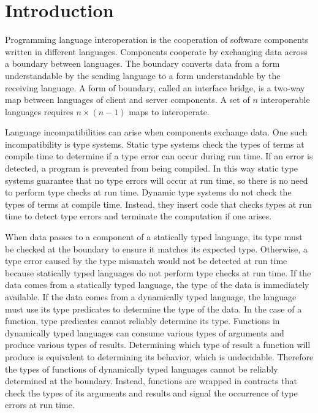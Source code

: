 \chapter{Introduction}

Programming language interoperation is the cooperation of software components written in different languages.  Components cooperate by exchanging data across a boundary between languages.  The boundary converts data from a form understandable by the sending language to a form understandable by the receiving language.  A form of boundary, called an interface bridge, is a two-way map between languages of client and server components.  A set of $n$ interoperable languages requires $n\times(n-1)$ maps to interoperate.

Language incompatibilities can arise when components exchange data.  One such incompatibility is type systems.  Static type systems check the types of terms at compile time to determine if a type error can occur during run time.  If an error is detected, a program is prevented from being compiled.  In this way static type systems guarantee that no type errors will occur at run time, so there is no need to perform type checks at run time.  Dynamic type systems do not check the types of terms at compile time.  Instead, they insert code that checks types at run time to detect type errors and terminate the computation if one arises.

When data passes to a component of a statically typed language, its type must be checked at the boundary to ensure it matches its expected type.  Otherwise, a type error caused by the type mismatch would not be detected at run time because statically typed languages do not perform type checks at run time.  If the data comes from a statically typed language, the type of the data is immediately available.  If the data comes from a dynamically typed language, the language must use its type predicates to determine the type of the data.  In the case of a function, type predicates cannot reliably determine its type.  Functions in dynamically typed languages can consume various types of arguments and produce various types of results.  Determining which type of result a function will produce is equivalent to determining its behavior, which is undecidable.  Therefore the types of functions of dynamically typed languages cannot be reliably determined at the boundary.  Instead, functions are wrapped in contracts that check the types of its arguments and results and signal the occurrence of type errors at run time.

